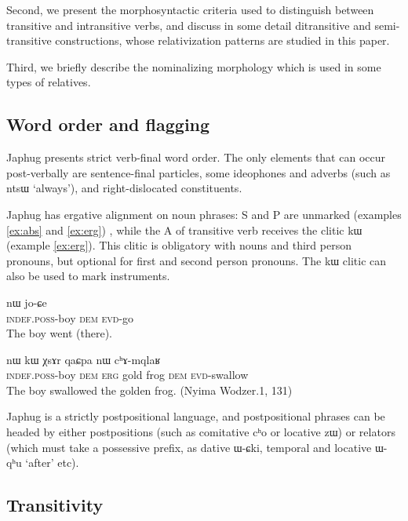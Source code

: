 \documentclass[oldfontcommands,oneside,a4paper,11pt]{article}
\newcommand{\ipa}[1]{{\phon #1}} %
\begin{document}
Second, we present the morphosyntactic criteria used to distinguish between transitive and intransitive verbs, and discuss in some detail ditransitive and semi-transitive constructions, whose relativization patterns are studied in this paper.

Third, we briefly describe the nominalizing morphology which is used in some types of relatives.

\subsection{Word order and flagging}

Japhug presents strict verb-final word order. The only elements that can occur post-verbally are sentence-final particles, some ideophones and adverbs (such as \ipa{ntsɯ} `always'), and right-dislocated constituents.

Japhug has ergative alignment on noun phrases:  S and P are unmarked (examples \ref{ex:abs} and \ref{ex:erg}) , while the A of transitive verb receives the clitic \ipa{kɯ} (example \ref{ex:erg}). This clitic is obligatory with nouns and third person pronouns, but optional for first and second person pronouns. The \ipa{kɯ} clitic can also be used to mark instruments.

\begin{exe}
\ex \label{ex:abs}
\gll \ipa{tɤ-tɕɯ}  	\ipa{nɯ}  	 	\ipa{jo-ɕe}   \\
\textsc{indef.poss}-boy \textsc{dem}   \textsc{evd}-go \\
\glt The boy went (there).
\end{exe}

\begin{exe}
\ex \label{ex:erg}
\gll \ipa{tɤ-tɕɯ}  	\ipa{nɯ}  	\ipa{kɯ}  	\ipa{χsɤr}  	\ipa{qaɕpa}  	\ipa{nɯ}  	\ipa{cʰɤ-mqlaʁ}   \\
\textsc{indef.poss}-boy \textsc{dem} \textsc{erg} gold frog \textsc{dem} \textsc{evd}-swallow \\
\glt The boy swallowed the golden frog. (Nyima Wodzer.1, 131)
\end{exe}


Japhug is a strictly postpositional language, and postpositional phrases can be headed by either postpositions (such as comitative \ipa{cʰo} or locative \ipa{zɯ}) or relators (which must take a possessive prefix, as dative \ipa{ɯ-ɕki}, temporal and locative  \ipa{ɯ-qʰu} `after' etc).

 

\subsection{Transitivity} \label{sec:trans}
\end{document}
